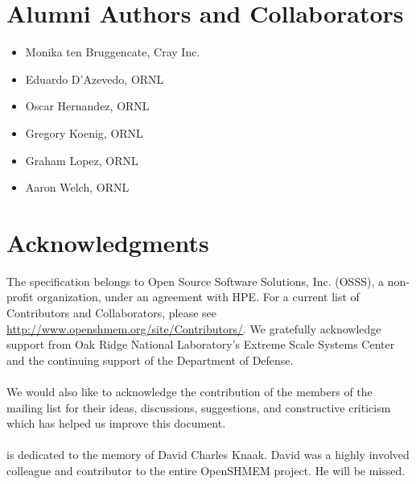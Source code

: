 \section*{Alumni Authors and Collaborators}
\begin{itemize}
\item Monika ten Bruggencate, Cray Inc.
\item Eduardo D'Azevedo, \ac{ORNL}
\item Oscar Hernandez, \ac{ORNL}
\item Gregory Koenig, \ac{ORNL}
\item Graham Lopez, \ac{ORNL}
\item Aaron Welch, \ac{ORNL}

\end{itemize}

\date{\today}

\section*{Acknowledgments}
The \openshmem specification belongs to Open Source Software Solutions, Inc.
(OSSS), a non-profit organization, under an agreement with HPE. For a current list
of Contributors and Collaborators, please see
  \url{http://www.openshmem.org/site/Contributors/}.
We gratefully acknowledge support from
Oak Ridge National Laboratory's
Extreme Scale Systems Center and the continuing support of the Department of Defense.\\
\\
We would also like to acknowledge the contribution of the members of the
\openshmem mailing list for their ideas, discussions, suggestions, and
constructive criticism which has helped us improve this document.\\
\\
\openshmem[1.4] is dedicated to the memory of David Charles Knaak. David was a highly involved
colleague and contributor to the entire OpenSHMEM project. He will be missed.

